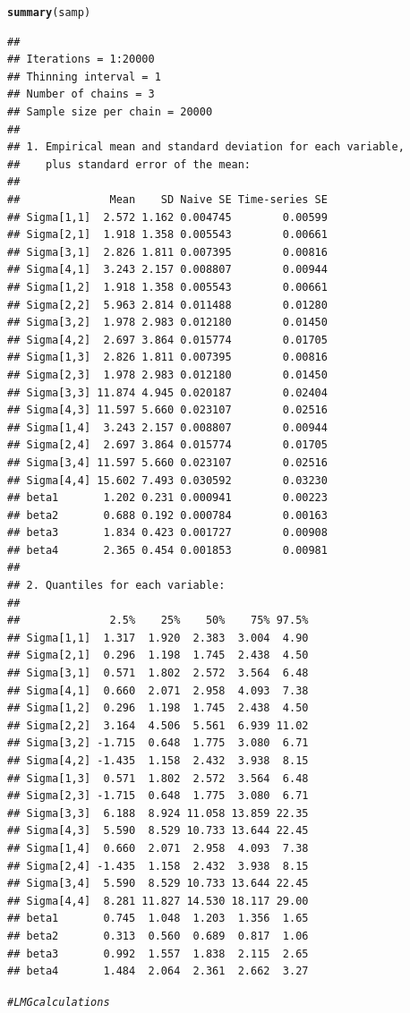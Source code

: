 \documentclass[11pt,a4paper,twoside]{book}\usepackage[]{graphicx}\usepackage[]{color}
\makeatletter
\newcommand{\hlcom}[1]{\textcolor[rgb]{0.678,0.584,0.686}{\textit{#1}}}%
\newcommand{\hlstd}[1]{\textcolor[rgb]{0.345,0.345,0.345}{#1}}%
\newcommand{\hlkwd}[1]{\textcolor[rgb]{0.737,0.353,0.396}{\textbf{#1}}}%
\newenvironment{kframe}{%
 \def\at@end@of@kframe{}%
 \ifinner\ifhmode%
  \def\at@end@of@kframe{\end{minipage}}%
  \begin{minipage}{\columnwidth}%
 \fi\fi%
 \def\FrameCommand##1{\hskip\@totalleftmargin \hskip-\fboxsep
 \colorbox{shadecolor}{##1}\hskip-\fboxsep
     \hskip-\linewidth \hskip-\@totalleftmargin \hskip\columnwidth}%
 \MakeFramed {\advance\hsize-\width
   \@totalleftmargin\z@ \linewidth\hsize
   \@setminipage}}%
 {\par\unskip\endMakeFramed%
 \at@end@of@kframe}
\newenvironment{knitrout}{}{} %
\makeatother
\begin{document}
\begin{knitrout}
\begin{kframe}
\begin{alltt}
\hlkwd{summary}\hlstd{(samp)}
\end{alltt}
\begin{verbatim}
## 
## Iterations = 1:20000
## Thinning interval = 1 
## Number of chains = 3 
## Sample size per chain = 20000 
## 
## 1. Empirical mean and standard deviation for each variable,
##    plus standard error of the mean:
## 
##              Mean    SD Naive SE Time-series SE
## Sigma[1,1]  2.572 1.162 0.004745        0.00599
## Sigma[2,1]  1.918 1.358 0.005543        0.00661
## Sigma[3,1]  2.826 1.811 0.007395        0.00816
## Sigma[4,1]  3.243 2.157 0.008807        0.00944
## Sigma[1,2]  1.918 1.358 0.005543        0.00661
## Sigma[2,2]  5.963 2.814 0.011488        0.01280
## Sigma[3,2]  1.978 2.983 0.012180        0.01450
## Sigma[4,2]  2.697 3.864 0.015774        0.01705
## Sigma[1,3]  2.826 1.811 0.007395        0.00816
## Sigma[2,3]  1.978 2.983 0.012180        0.01450
## Sigma[3,3] 11.874 4.945 0.020187        0.02404
## Sigma[4,3] 11.597 5.660 0.023107        0.02516
## Sigma[1,4]  3.243 2.157 0.008807        0.00944
## Sigma[2,4]  2.697 3.864 0.015774        0.01705
## Sigma[3,4] 11.597 5.660 0.023107        0.02516
## Sigma[4,4] 15.602 7.493 0.030592        0.03230
## beta1       1.202 0.231 0.000941        0.00223
## beta2       0.688 0.192 0.000784        0.00163
## beta3       1.834 0.423 0.001727        0.00908
## beta4       2.365 0.454 0.001853        0.00981
## 
## 2. Quantiles for each variable:
## 
##              2.5%    25%    50%    75% 97.5%
## Sigma[1,1]  1.317  1.920  2.383  3.004  4.90
## Sigma[2,1]  0.296  1.198  1.745  2.438  4.50
## Sigma[3,1]  0.571  1.802  2.572  3.564  6.48
## Sigma[4,1]  0.660  2.071  2.958  4.093  7.38
## Sigma[1,2]  0.296  1.198  1.745  2.438  4.50
## Sigma[2,2]  3.164  4.506  5.561  6.939 11.02
## Sigma[3,2] -1.715  0.648  1.775  3.080  6.71
## Sigma[4,2] -1.435  1.158  2.432  3.938  8.15
## Sigma[1,3]  0.571  1.802  2.572  3.564  6.48
## Sigma[2,3] -1.715  0.648  1.775  3.080  6.71
## Sigma[3,3]  6.188  8.924 11.058 13.859 22.35
## Sigma[4,3]  5.590  8.529 10.733 13.644 22.45
## Sigma[1,4]  0.660  2.071  2.958  4.093  7.38
## Sigma[2,4] -1.435  1.158  2.432  3.938  8.15
## Sigma[3,4]  5.590  8.529 10.733 13.644 22.45
## Sigma[4,4]  8.281 11.827 14.530 18.117 29.00
## beta1       0.745  1.048  1.203  1.356  1.65
## beta2       0.313  0.560  0.689  0.817  1.06
## beta3       0.992  1.557  1.838  2.115  2.65
## beta4       1.484  2.064  2.361  2.662  3.27
\end{verbatim}
\begin{alltt}
\hlcom{#LMG calculations}


\end{alltt}
\end{kframe}
\end{knitrout}
\end{document}
